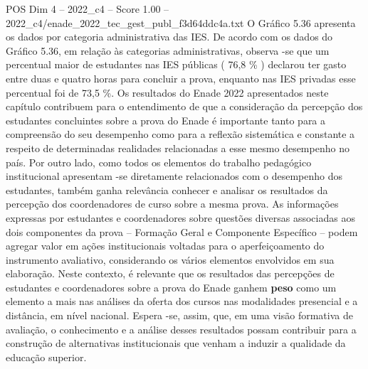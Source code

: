 \begin{textsample}{POS Dim 4 – 2022\_c4 – Score 1.00 – 2022\_c4/enade\_2022\_tec\_gest\_publ\_f3d64ddc4a.txt}
O Gráfico 5.36 apresenta os dados por categoria administrativa das IES.
De acordo com os dados do Gráfico 5.36, em relação às categorias administrativas, observa -se que um percentual maior de estudantes nas IES públicas ( 76,8 \% ) declarou ter gasto entre duas e quatro horas para concluir a prova, enquanto nas IES privadas esse percentual foi de 73,5 \%.
Os resultados do Enade 2022 apresentados neste capítulo contribuem para o entendimento de que a consideração da percepção dos estudantes concluintes sobre a prova do Enade é importante tanto para a compreensão do seu desempenho como para a reflexão sistemática e constante a respeito de determinadas realidades relacionadas a esse mesmo desempenho no país.
Por outro lado, como todos os elementos do trabalho pedagógico institucional apresentam -se diretamente relacionados com o desempenho dos estudantes, também ganha relevância conhecer e analisar os resultados da percepção dos coordenadores de curso sobre a mesma prova.
As informações expressas por estudantes e coordenadores sobre questões diversas associadas aos dois componentes da prova – Formação Geral e Componente Específico – podem agregar valor em ações institucionais voltadas para o aperfeiçoamento do instrumento avaliativo, considerando os vários elementos envolvidos em sua elaboração.
Neste contexto, é relevante que os resultados das percepções de estudantes e coordenadores sobre a prova do Enade ganhem \textbf{peso} como um elemento a mais nas análises da oferta dos cursos nas modalidades presencial e a distância, em nível nacional.
Espera -se, assim, que, em uma visão formativa de avaliação, o conhecimento e a análise desses resultados possam contribuir para a construção de alternativas institucionais que venham a induzir a qualidade da educação superior.

\end{textsample}
